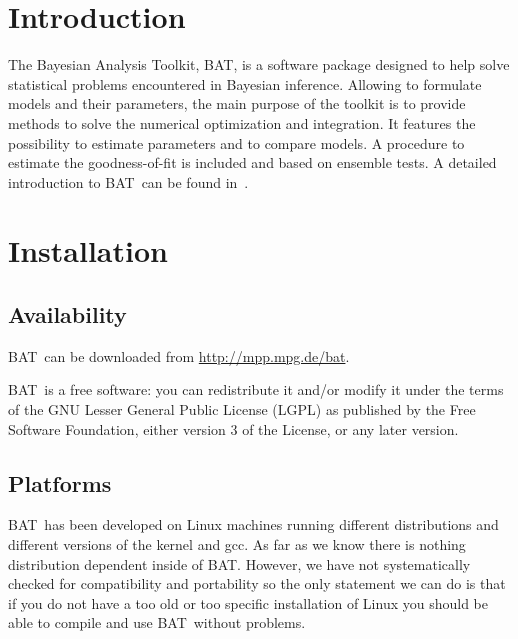 \documentclass[11pt, a4paper]{article}
\newcommand{\bat}{{\sc BAT}}
\begin{document}
\section{Introduction}
\label{section:introduction}

The Bayesian Analysis Toolkit, \bat, is a software package designed to
help solve statistical problems encountered in Bayesian
inference. Allowing to formulate models and their parameters, the main
purpose of the toolkit is to provide methods to solve the numerical
optimization and integration. It features the possibility to estimate
parameters and to compare models. A procedure to estimate the
goodness-of-fit is included and based on ensemble tests. A detailed
introduction to \bat\ can be found in~\cite{Caldwell:2008fw}.


\section{Installation}
\label{section:installation}

\subsection{Availability}

\bat\ can be downloaded from \url{http://mpp.mpg.de/bat}.

\bat\ is a free software: you can redistribute it and/or modify it
under the terms of the GNU Lesser General Public License (LGPL) as
published by the Free Software Foundation, either version 3 of
the License, or any later version.


\subsection{Platforms}

\bat\ has been developed on Linux machines running different distributions
and different versions of the kernel and gcc. As far as we know there
is nothing distribution dependent inside of \bat. However, we have not
systematically checked for compatibility and portability so the only
statement we can do is that if you do not have a too old or too
specific installation of Linux you should be able to compile and use
\bat\ without problems.
\end{document}
